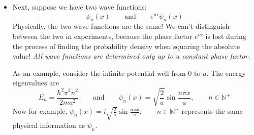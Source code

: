 \documentclass[11pt, a4paper]{article}
\newcommand{\eqtext}[1]{\qquad \text{#1} \qquad}
\begin{document}
\begin{itemize}
	\item Next, suppose we have two wave functions:
	\begin{equation*}
		\psi_{n}(x) \eqtext{and} e^{i \alpha}\psi_{n}(x)
	\end{equation*}
	Physically, the two wave functions are the same! We can't distinguish between the two in experiments, because the phase factor $ e^{i \alpha} $ is lost during the process of finding the probability density when squaring the absolute value! \textit{All wave functions are determined only up to a constant phase factor.}
	
	As an example, consider the infinite potential well from $ 0 $ to $ a $. The energy eigenvalues are
	\begin{equation*}
		E_{n} = \frac{\hbar^{2} \pi^{2} n^{2}}{2ma^{2}} \eqtext{and} \psi_{n}(x) = \sqrt{\frac{2}{a}} \sin \frac{n\pi x}{a}, \qquad n \in \mathbb{N}^{+}
	\end{equation*}
	Now for example, $ \tilde{\psi}_{n}(x) = i \sqrt{\frac{2}{a}} \sin \frac{n\pi x}{a}, \qquad n \in \mathbb{N}^{+} $ represents the same physical information as $ \psi_{n} $. 
\end{itemize}
\end{document}
